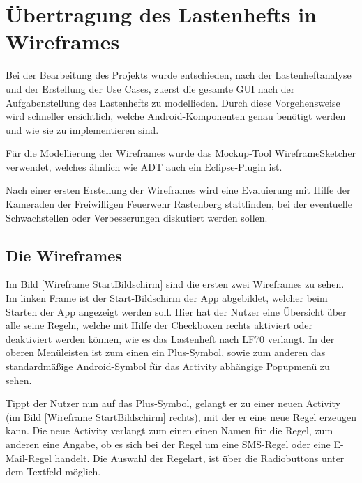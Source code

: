 \section{\"Ubertragung des Lastenhefts in Wireframes}
\label{Wireframes}

Bei der Bearbeitung des Projekts wurde entschieden, nach der Lastenheftanalyse und der Erstellung der Use Cases, zuerst die gesamte GUI nach der Aufgabenstellung des Lastenhefts zu modellieden. Durch diese Vorgehensweise wird schneller ersichtlich, welche Android-Komponenten genau ben\"otigt werden und wie sie zu implementieren sind.

F\"ur die Modellierung der Wireframes wurde das Mockup-Tool WireframeSketcher verwendet, welches \"ahnlich wie \ac{ADT} auch ein Eclipse-Plugin ist. 

Nach einer ersten Erstellung der Wireframes wird eine Evaluierung mit Hilfe der Kameraden der Freiwilligen Feuerwehr Rastenberg stattfinden, bei der eventuelle Schwachstellen oder Verbesserungen diskutiert werden sollen.

\subsection{Die Wireframes}

Im Bild \ref{Wireframe StartBildschirm} sind die ersten zwei Wireframes zu sehen. Im linken Frame ist der Start-Bildschirm der App abgebildet, welcher beim Starten der App angezeigt werden soll. Hier hat der Nutzer eine \"Ubersicht \"uber alle seine Regeln, welche mit Hilfe der Checkboxen rechts aktiviert oder deaktiviert werden k\"onnen, wie es das Lastenheft nach LF70 verlangt. In der oberen Men\"uleisten ist zum einen ein Plus-Symbol, sowie zum anderen das standardm\"a\ss{}ige Android-Symbol f\"ur das Activity abh\"angige Popupmen\"u zu sehen.

Tippt der Nutzer nun auf das Plus-Symbol, gelangt er zu einer neuen Activity (im Bild \ref{Wireframe StartBildschirm} rechts), mit der er eine neue Regel erzeugen kann.
Die neue Activity verlangt zum einen einen Namen f\"ur die Regel, zum anderen eine Angabe, ob es sich bei der Regel um eine SMS-Regel oder eine E-Mail-Regel handelt. Die Auswahl der Regelart, ist \"uber die Radiobuttons unter dem Textfeld m\"oglich.

